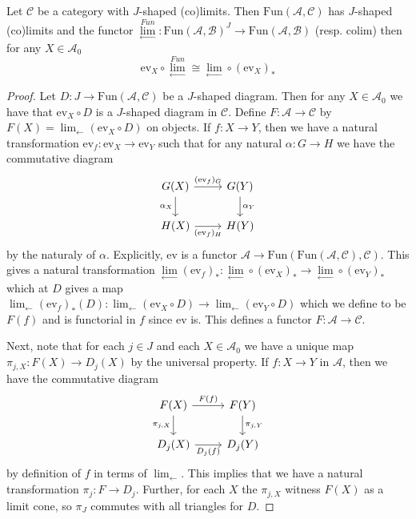 \begin{lem}[label=lem:limsinFuncCat]
    Let $\mathcal{C}$ be a category with $J$-shaped (co)limits. Then $\text{Fun}(\mathcal{A},\mathcal{C})$ has $J$-shaped (co)limits and the functor $\lim\limits_{\leftarrow}^{Fun}:\text{Fun}(\mathcal{A},\mathcal{B})^J\to \text{Fun}(\mathcal{A},\mathcal{B})$ (resp. $\text{colim}$) then for any $X \in \mathcal{A}_0$
    \begin{equation*}
        \text{ev}_X\circ \lim\limits_{\leftarrow}^{Fun} \cong \lim\limits_{\leftarrow}\circ (\text{ev}_X)_*
    \end{equation*}
\end{lem}
\begin{proof}
    Let $D:J\to \text{Fun}(\mathcal{A},\mathcal{C})$ be a $J$-shaped diagram. Then for any $X \in \mathcal{A}_0$ we have that $\text{ev}_X\circ D$ is a $J$-shaped diagram in $\mathcal{C}$. Define $F:\mathcal{A}\to \mathcal{C}$ by $F(X) = \lim_{\leftarrow}(\text{ev}_X\circ D)$ on objects. If $f:X\to Y$, then we have a natural transformation $\text{ev}_f:\text{ev}_X\to \text{ev}_Y$ such that for any natural $\alpha:G\to H$ we have the commutative diagram
    \[\begin{tikzcd}
        {G(X)} & {G(Y)} \\
        {H(X)} & {H(Y)}
        \arrow["{(\text{ev}_f)_G}", from=1-1, to=1-2]
        \arrow["{\alpha_X}"', from=1-1, to=2-1]
        \arrow["{(\text{ev}_f)_H}"', from=2-1, to=2-2]
        \arrow["{\alpha_Y}", from=1-2, to=2-2]
    \end{tikzcd}\]
    by the naturaly of $\alpha$. Explicitly, $\text{ev}$ is a functor $\mathcal{A}\to \text{Fun}(\text{Fun}(\mathcal{A},\mathcal{C}),\mathcal{C})$. This gives a natural transformation $\lim\limits_{\leftarrow}(\text{ev}_f)_*:\lim\limits_{\leftarrow}\circ (\text{ev}_X)_*\to \lim\limits_{\leftarrow}\circ (\text{ev}_Y)_*$ which at $D$ gives a map $\lim_{\leftarrow}(\text{ev}_f)_*(D):\lim_{\leftarrow}(\text{ev}_X\circ D) \to \lim_{\leftarrow}(\text{ev}_Y\circ D)$ which we define to be $F(f)$ and is functorial in $f$ since $\text{ev}$ is. This defines a functor $F:\mathcal{A}\to \mathcal{C}$.

    \vspace{10pt}

    Next, note that for each $j \in J$ and each $X \in \mathcal{A}_0$ we have a unique map $\pi_{j,X}:F(X)\to D_j(X)$ by the universal property. If $f:X\to Y$ in $\mathcal{A}$, then we have the commutative diagram
    \[\begin{tikzcd}
        {F(X)} & {F(Y)} \\
        {D_j(X)} & {D_j(Y)}
        \arrow["{F(f)}", from=1-1, to=1-2]
        \arrow["{\pi_{j,X}}"', from=1-1, to=2-1]
        \arrow["{D_j(f)}"', from=2-1, to=2-2]
        \arrow["{\pi_{j,Y}}", from=1-2, to=2-2]
    \end{tikzcd}\]
    by definition of $f$ in terms of $\lim_{\leftarrow}$. This implies that we have a natural transformation $\pi_j:F\to D_j$. Further, for each $X$ the $\pi_{j,X}$ witness $F(X)$ as a limit cone, so $\pi_J$ commutes with all triangles for $D$.


\end{proof}
